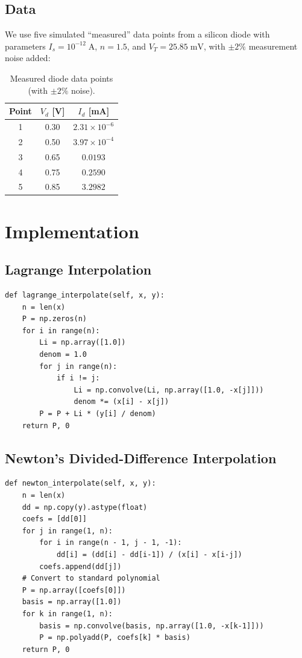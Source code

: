 \documentclass[letterpaper,twocolumn,fleqn]{article}
\begin{document}
\subsection{Data}
We use five simulated ``measured'' data points from a silicon diode with
parameters $I_s = 10^{-12}\;\text{A}$, $n = 1.5$, and $V_T = 25.85\;\text{mV}$,
with $\pm2\%$ measurement noise added:

\begin{table}[H]
\centering
\begin{tabular}{@{}ccc@{}}
\toprule
\textbf{Point} & $V_d$ [V] & $I_d$ [mA] \\
\midrule
1 & 0.30 & $2.31 \times 10^{-6}$ \\
2 & 0.50 & $3.97 \times 10^{-4}$ \\
3 & 0.65 & $0.0193$ \\
4 & 0.75 & $0.2590$ \\
5 & 0.85 & $3.2982$ \\
\bottomrule
\end{tabular}
\caption{Measured diode data points (with $\pm2\%$ noise).}
\label{tab:data}
\end{table}

\section{Implementation}

\subsection{Lagrange Interpolation}
\begin{lstlisting}[caption={Lagrange interpolation (tools.py)},label={lst:lagrange}]
def lagrange_interpolate(self, x, y):
    n = len(x)
    P = np.zeros(n)
    for i in range(n):
        Li = np.array([1.0])
        denom = 1.0
        for j in range(n):
            if i != j:
                Li = np.convolve(Li, np.array([1.0, -x[j]]))
                denom *= (x[i] - x[j])
        P = P + Li * (y[i] / denom)
    return P, 0
\end{lstlisting}

\subsection{Newton's Divided-Difference Interpolation}
\begin{lstlisting}[caption={Newton's divided-difference interpolation (tools.py)},label={lst:newton}]
def newton_interpolate(self, x, y):
    n = len(x)
    dd = np.copy(y).astype(float)
    coefs = [dd[0]]
    for j in range(1, n):
        for i in range(n - 1, j - 1, -1):
            dd[i] = (dd[i] - dd[i-1]) / (x[i] - x[i-j])
        coefs.append(dd[j])
    # Convert to standard polynomial
    P = np.array([coefs[0]])
    basis = np.array([1.0])
    for k in range(1, n):
        basis = np.convolve(basis, np.array([1.0, -x[k-1]]))
        P = np.polyadd(P, coefs[k] * basis)
    return P, 0
\end{lstlisting}
\end{document}
